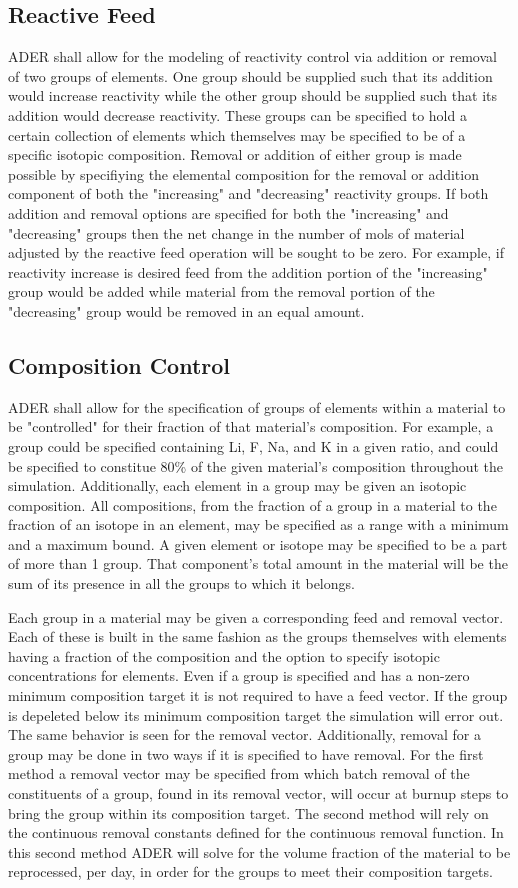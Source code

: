 \documentclass[12pt]{article}
\begin{document}
\subsection{Reactive Feed}
ADER shall allow for the modeling of reactivity control via addition or
removal of two groups of elements. One group should be supplied such that its
addition would increase reactivity while the other group should be supplied
such that its addition would decrease reactivity. These groups can be
specified to hold a certain collection of elements which themselves
may be specified to be of a specific isotopic composition. Removal or addition
of either group is made possible by specifiying the elemental composition
for the removal or addition component of both the "increasing" and "decreasing"
reactivity groups. If both addition and removal options are specified for
both the "increasing" and "decreasing" groups then the net change in the number
of mols of material adjusted by the reactive feed operation will be sought to
be zero. For example, if reactivity increase is desired feed from the addition
portion of the "increasing" group would be added while material from the
removal portion of the "decreasing" group would be removed in an equal amount.
\subsection{Composition Control}
ADER shall allow for the specification of groups of elements within a material
to be "controlled" for their fraction of that material's composition. For
example, a group could be specified containing Li, F, Na, and K in a given
ratio, and could
be specified to constitue 80\% of the given material's composition
throughout the simulation. Additionally, each element in a group may be given
an isotopic composition. All compositions, from the fraction of a group in a
material
to the fraction of an isotope in an element,
may be specified as a range with a minimum
and a maximum bound. A given element or isotope may be specified to be a part
of more than 1 group. That component's total amount in the material will be
the sum of its presence in all the groups to which it belongs. \par
Each group in a material may be given a corresponding feed and removal
vector. Each of these is built in the same fashion as the groups themselves
with elements having a fraction of the composition and the option to specify
isotopic concentrations for elements. Even if a group is specified and has a
non-zero minimum composition target it is not required to have a feed vector.
If the group is depeleted below its minimum composition target the simulation
will error out. The same behavior is seen for the removal vector. Additionally,
removal for a group may be done in two ways if it is specified to have removal.
For the first method a removal vector may be specified from which batch
removal of the
constituents of a group, found in its removal vector, will occur at burnup 
steps to bring the group within its composition target. The second method
will rely on the continuous removal constants defined for the continuous
removal function. In this second method ADER will solve for the volume fraction
of the material to be reprocessed, per day, in order for the groups to meet
their composition targets.
\end{document}
